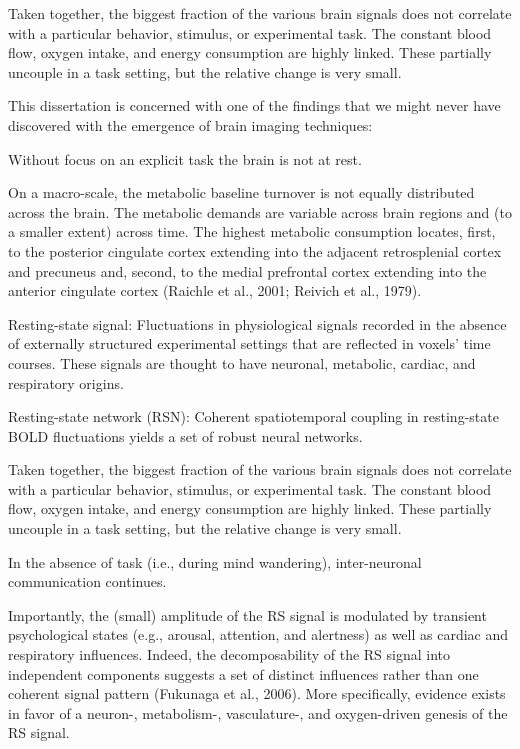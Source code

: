 \documentclass[authoryear,review,3p]{elsarticle}
\begin{document}
Taken together, the biggest fraction of the various brain signals does not correlate with a particular behavior, stimulus, or experimental task. The constant blood flow, oxygen intake, and energy consumption are highly linked. These partially uncouple in a task setting, but the relative change is very small.

This dissertation is concerned with one of the findings that
we might never have discovered with the emergence of
brain imaging techniques:

Without focus on an explicit task the brain is not at rest.

On a macro-scale, the metabolic baseline turnover is not equally distributed across the brain. The metabolic demands are variable across brain regions and (to a smaller extent) across time. The highest metabolic consumption locates, first, to the posterior cingulate cortex extending into the adjacent retrosplenial cortex and precuneus and, second, to the medial prefrontal cortex extending into the anterior cingulate cortex (Raichle et al., 2001; Reivich et al., 1979).

Resting-state signal: Fluctuations in physiological signals recorded in the absence of externally structured experimental settings that are reflected in voxels' time courses. These signals are thought to have neuronal, metabolic, cardiac, and respiratory origins.

Resting-state network (RSN):  Coherent spatiotemporal coupling in resting-state BOLD fluctuations yields a set of robust neural networks.

Taken together, the biggest fraction of the various brain signals does not correlate with a particular behavior, stimulus, or experimental task. The constant blood flow, oxygen intake, and energy consumption are highly linked. These partially uncouple in a task setting, but the relative change is very small.

In the absence of task (i.e., during mind wandering), inter-neuronal communication continues.

Importantly, the (small) amplitude of the RS signal is modulated by transient psychological states (e.g., arousal, attention, and alertness) as well as cardiac and respiratory influences. Indeed, the decomposability of the RS signal into independent components suggests a set of distinct influences rather than one coherent signal pattern (Fukunaga et al., 2006). More specifically, evidence exists in favor of a neuron-, metabolism-, vasculature-, and oxygen-driven genesis of the RS signal. 
\end{document}
